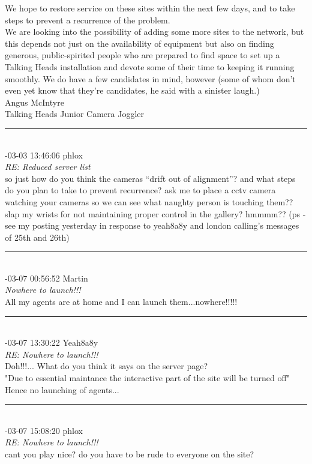 \begin{mail}
We hope to restore service on these sites within the next few days, and to take steps to prevent a recurrence of the problem.\\
We are looking into the possibility of adding some more sites to the network, but this depends not just on the availability of equipment but also on finding generous, public-spirited people who are prepared to find space to set up a Talking Heads installation and devote some of their time to keeping it running smoothly. We do have a few candidates in mind, however (some of whom don't even yet know that they're candidates, he said with a sinister laugh.) \\
    Angus McIntyre\\
    Talking Heads Junior Camera Joggler\\
\rule{0.8\textwidth}{.4pt}\\
{-03-03 13:46:06 phlox}\\
{\itshape RE: Reduced server list}\\
so just how do you think the cameras ``drift out of alignment''? and what steps do you plan to take to prevent recurrence? ask me to place a cctv camera watching your cameras so we can see what naughty person is touching them?? slap my wrists for not maintaining proper control in the gallery? hmmmm?? (ps - see my posting yesterday in response to yeah8a8y and london calling's messages of 25th and 26th)\\
\rule{0.8\textwidth}{.4pt}\\
{-03-07 00:56:52 Martin}\\
{\itshape Nowhere to launch!!!}\\
All my agents are at home and I can launch them...nowhere!!!!!\\
\rule{0.8\textwidth}{.4pt}\\
{-03-07 13:30:22 Yeah8a8y}\\
{\itshape RE: Nowhere to launch!!!}\\
Doh!!!... What do you think it says on the server page?\\
"Due to essential maintance the interactive part of the site will be turned off"\\
Hence no launching of agents...\\
\rule{0.8\textwidth}{.4pt}\\
{-03-07 15:08:20 phlox}\\
{\itshape RE: Nowhere to launch!!!}\\
cant you play nice? do you have to be rude to everyone on the site?\\

\end{mail}
